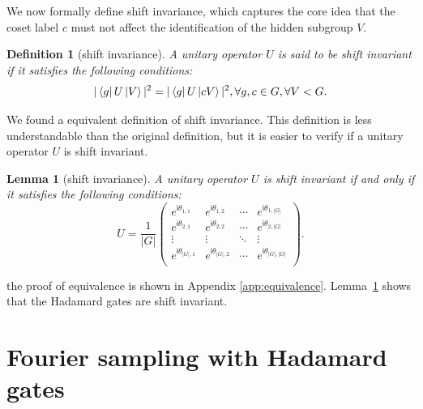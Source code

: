 \documentclass[aps,reprint,showpacs,tightenlines, twocolumn]{revtex4-2}
\newtheorem{lemma}{Lemma}
\newtheorem{definition}{Definition}
\newcommand{\todo}[1]{\textcolor{purple}{[#1]}}
\newcommand{\ii}{\mathsf{i}}
\begin{document}
We now formally define shift invariance, which captures the core idea that the coset label $c$ must not affect the identification of the hidden subgroup $V$.
\begin{definition}[shift invariance]
	A unitary operator $U$ is said to be shift invariant if it satisfies the following conditions:
	\begin{equation}
	    | \bra{g} U \ket{V} |^2 = | \bra{g} U \ket{cV} |^2, \forall g , c \in G, \forall V < G.
	\end{equation}
\end{definition}
We found a equivalent definition of shift invariance. This definition is less understandable than the original definition, but it is easier to verify if a unitary operator $U$ is shift invariant.
\begin{lemma}[shift invariance]
\label{lemma: shift-invariance}
	A unitary operator $U$ is shift invariant if and only if it satisfies the following conditions:
	\begin{equation}
	    U = \frac{1}{ |G| }
		\begin{pmatrix}
			e^{\ii \theta_{1,1}} & e^{\ii \theta_{1,2}} & \cdots & e^{\ii \theta_{1,|G|}} \\
			e^{\ii \theta_{2,1}} & e^{\ii \theta_{2,2}} & \cdots & e^{\ii \theta_{2,|G|}} \\
			\vdots & \vdots & \ddots & \vdots \\
			e^{\ii \theta_{|G|,1}} & e^{\ii \theta_{|G|,2}} & \cdots & e^{\ii \theta_{ |G|,|G|}} \\
		\end{pmatrix}.
	\end{equation}
\end{lemma}
the proof of equivalence is shown in Appendix \ref{app:equivalence}.
Lemma~\ref{lemma: shift-invariance} shows that the Hadamard gates are shift invariant.




\section{Fourier sampling with Hadamard gates}
\label{sec:hsp_with_spongebob}
\end{document}
